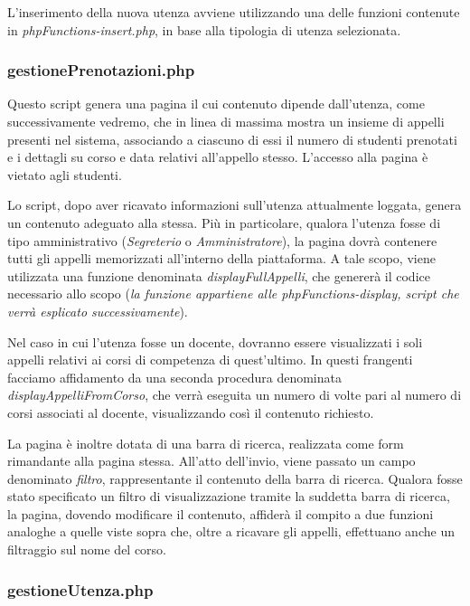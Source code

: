 \documentclass [a4paper,11pt]{book}
\begin{document}
L'inserimento della nuova utenza avviene utilizzando una delle funzioni contenute in \emph{phpFunctions-insert.php}, in base alla tipologia di utenza selezionata.
 
\medskip

\subsubsection{gestionePrenotazioni.php}

Questo script genera una pagina il cui contenuto dipende dall'utenza, come successivamente vedremo, che in linea di massima mostra un insieme di appelli presenti nel sistema, associando a ciascuno di essi il numero di studenti prenotati e i dettagli su corso e data relativi all'appello stesso. L'accesso alla pagina è vietato agli studenti.

Lo script, dopo aver ricavato informazioni sull'utenza attualmente loggata, genera un contenuto adeguato alla stessa. Più in particolare, qualora l'utenza fosse di tipo amministrativo (\emph{Segreterio} o \emph{Amministratore}), la pagina dovrà contenere tutti gli appelli memorizzati all'interno della piattaforma. A tale scopo, viene utilizzata una funzione denominata \emph{displayFullAppelli}, che genererà il codice necessario allo scopo (\emph{la funzione appartiene alle phpFunctions-display, script che verrà esplicato successivamente}).

Nel caso in cui l'utenza fosse un docente, dovranno essere visualizzati i soli appelli relativi ai corsi di competenza di quest'ultimo. In questi frangenti facciamo affidamento da una seconda procedura denominata \emph{displayAppelliFromCorso}, che verrà eseguita un numero di volte pari al numero di corsi associati al docente, visualizzando così il contenuto richiesto.

\medskip

La pagina è inoltre dotata di una barra di ricerca, realizzata come form rimandante alla pagina stessa. All'atto dell'invio, viene passato un campo denominato \emph{filtro}, rappresentante il contenuto della barra di ricerca. Qualora fosse stato specificato un filtro di visualizzazione tramite la suddetta barra di ricerca, la pagina, dovendo modificare il contenuto, affiderà il compito a due funzioni analoghe a quelle viste sopra che, oltre a ricavare gli appelli, effettuano anche un filtraggio sul nome del corso.

\medskip

\subsubsection{gestioneUtenza.php}
\end{document}
